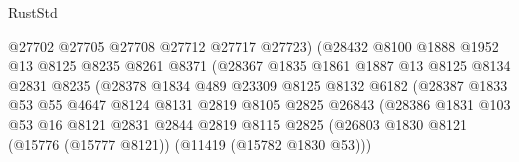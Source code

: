 \begin{lexlean}{RustStd}
\begin{coremodule}
                                  @27702
                                  @27705
                                  @27708
                                  @27712
                                  @27717
                                  @27723)
                                (@28432
                                  @8100
                                  @1888
                                  @1952
                                  @13
                                  @8125
                                  @8235
                                  @8261
                                  @8371
                                  (@28367
                                    @1835
                                    @1861
                                    @1887
                                    @13
                                    @8125
                                    @8134
                                    @2831
                                    @8235
                                    (@28378
                                      @1834
                                      @489
                                      @23309
                                      @8125
                                      @8132
                                      @6182
                                      (@28387
                                        @1833
                                        @53
                                        @55
                                        @4647
                                        @8124
                                        @8131
                                        @2819
                                        @8105
                                        @2825
                                        @26843
                                        (@28386
                                          @1831
                                          @103
                                          @53
                                          @16
                                          @8121
                                          @2831
                                          @2844
                                          @2819
                                          @8115
                                          @2825
                                          (@26803
                                            @1830
                                            @8121
                                            (@15776 (@15777 @8121))
                                            (@11419 (@15782 @1830 @53)))

\end{coremodule}
\end{lexlean}
